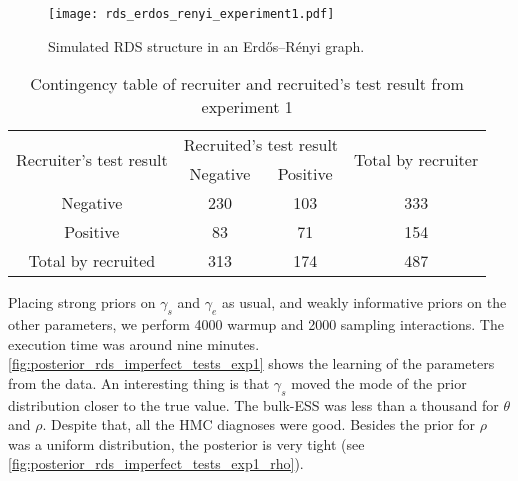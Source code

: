 \begin{figure}[htb]
  \centering
  \caption{\label{fig:rds_erdos_renyi_experiment1}Simulated RDS structure in
    an Erdős–Rényi graph.}
  \texttt{[image: rds\_erdos\_renyi\_experiment1.pdf]}
\end{figure}

\begin{table}[htb]
  \centering
  \caption{\label{tab:contingency-table-experiment1}Contingency table of
    recruiter and recruited's test result from experiment 1}
  \begin{tabular}{cccc}
    \hline
    \multirow{2}{*}{Recruiter's test result} & \multicolumn{2}{c}{Recruited's test result} & \multirow{2}{*}{Total by recruiter}       \\ \cline{2-3}
                                             & Negative                                    & Positive                            &     \\ \hline
    Negative                                 & 230                                         & 103                                 & 333 \\
    Positive                                 & 83                                          & 71                                  & 154 \\
    Total by recruited                       & 313                                         & 174                                 & 487 \\ \hline
  \end{tabular}
\end{table}

Placing strong priors on $\gamma_s$ and $\gamma_e$ as usual, and weakly
informative priors on the other parameters, we perform 4000 warmup and 2000
sampling interactions. The execution time was around nine minutes.
\autoref{fig:posterior_rds_imperfect_tests_exp1} shows the learning of the
parameters from the data. An interesting thing is that $\gamma_s$ moved the
mode of the prior distribution closer to the true value. The bulk-ESS was less
than a thousand for $\theta$ and $\rho$. Despite that, all the HMC diagnoses were
good. Besides the prior for $\rho$ was a uniform distribution, the posterior
is very tight (see \autoref{fig:posterior_rds_imperfect_tests_exp1_rho}).

